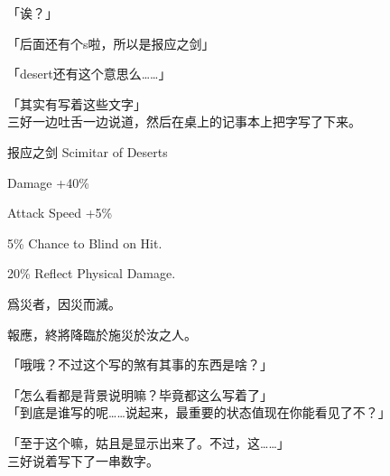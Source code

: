 「诶？」

「后面还有个s啦，所以是报应之剑」

「desert还有这个意思么……」

「其实有写着这些文字」\\

三好一边吐舌一边说道，然后在桌上的记事本上把字写了下来。\\

\cardline

  报应之剑  Scimitar of Deserts

%  
 

  Damage +40\%

  Attack Speed +5\%

  5\% Chance to Blind on Hit.

  20\% Reflect Physical Damage.

%  
 

  爲災者，因災而滅。

  報應，終將降臨於施災於汝之人。

\cardline

「哦哦？不过这个写的煞有其事的东西是啥？」

「怎么看都是背景说明嘛？毕竟都这么写着了」\\

「到底是谁写的呢……说起来，最重要的状态值现在你能看见了不？」

「至于这个嘛，姑且是显示出来了。不过，这……」\\

三好说着写下了一串数字。\\

